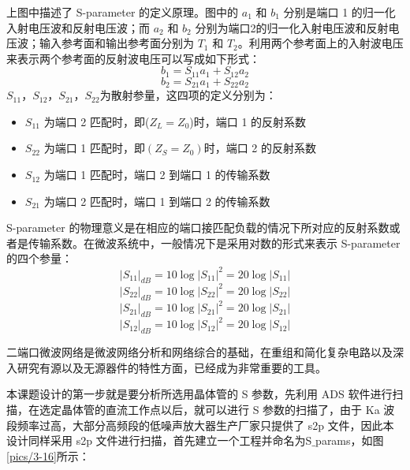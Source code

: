上图中描述了 S-parameter 的定义原理。图中的 $a_1$ 和 $b_1$ 分别是端口 1 的归一化入射电压波和反射电压波；而 $a_2$ 和 $b_2$ 分别为端口2的归一化入射电压波和反射电压波；输入参考面和输出参考面分别为 $T_1$ 和 $T_2$。利用两个参考面上的入射波电压来表示两个参考面的反射波电压可以写成如下形式：
\begin{equation}%
b_1=S_{11}a_1+S_{12}a_2
\end{equation}
\begin{equation}%
b_2=S_{21}a_1+S_{22}a_2
\end{equation}
$S_{11}$，$S_{12}$，$S_{21}$，$S_{22}$为散射参量，这四项的定义分别为：
\begin{itemize}
	\item $S_{11}$ 为端口 2 匹配时，即($Z_L=Z_0$)时，端口 1 的反射系数
	\item $S_{22}$ 为端口 1 匹配时，即$(Z_S=Z_0)$时，端口 2 的反射系数
	\item $S_{12}$ 为端口 1 匹配时，端口 2 到端口 1 的传输系数
	\item $S_{21}$ 为端口 2 匹配时，端口 1 到端口 2 的传输系数
\end{itemize}

S-parameter 的物理意义是在相应的端口接匹配负载的情况下所对应的反射系数或者是传输系数。在微波系统中，一般情况下是采用对数的形式来表示 S-parameter 的四个参量：
\begin{equation}%
|S_{11}|_{dB}=10\log|S_{11}|^2=20\log|S_{11}|
\end{equation}
\begin{equation}%
|S_{22}|_{dB}=10\log|S_{22}|^2=20\log|S_{22}|
\end{equation}
\begin{equation}%
|S_{21}|_{dB}=10\log|S_{21}|^2=20\log|S_{21}|
\end{equation}
\begin{equation}%
|S_{12}|_{dB}=10\log|S_{12}|^2=20\log|S_{12}|
\end{equation}

二端口微波网络是微波网络分析和网络综合的基础，在重组和简化复杂电路以及深入研究有源以及无源器件的特性方面，已经成为非常重要的工具。

本课题设计的第一步就是要分析所选用晶体管的 S 参数，先利用 ADS 软件进行扫描，在选定晶体管的直流工作点以后，就可以进行 S 参数的扫描了，由于 Ka 波段频率过高，大部分高频段的低噪声放大器生产厂家只提供了 s2p 文件，因此本设计同样采用 s2p 文件进行扫描，首先建立一个工程并命名为S$\_$params，如图\ref{pics/3-16}所示：


